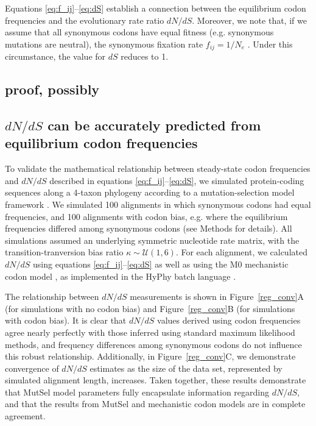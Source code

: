 \documentclass[11pt]{article}
\begin{document}
Equations \eqref{eq:f_ij}--\eqref{eq:dS} establish a connection between the equilibrium codon frequencies and the evolutionary rate ratio $dN/dS$. Moreover, we note that, if we assume that all synonymous codons have equal fitness (e.g. synonymous mutations are neutral), the synonymous fixation rate $f_{ij}= 1/N_e$ \cite{CrowKimura1970}. Under this circumstance, the value for $dS$ reduces to 1.

\subsection{proof, possibly}

\subsection*{$dN/dS$ can be accurately predicted from equilibrium codon frequencies}

To validate the mathematical relationship between steady-state codon frequencies and $dN/dS$ described in equations \eqref{eq:f_ij}--\eqref{eq:dS}, we simulated protein-coding sequences along a 4-taxon phylogeny according to a mutation-selection model framework \cite{HalpernBruno1998,SellaHirsh2005}. We simulated 100 alignments in which synonymous codons had equal frequencies, and 100 alignments with codon bias, e.g. where the equilibrium frequencies differed among synonymous codons (see Methods for details). All simulations assumed an underlying symmetric nucleotide rate matrix, with the transition-tranversion bias ratio $\kappa \sim \mathcal{U}(1,6)$. For each alignment, we calculated $dN/dS$ using equations \eqref{eq:f_ij}--\eqref{eq:dS} as well as using the M0 mechanistic codon model \cite{NielsenYang1998}, as implemented in the HyPhy batch language \cite{KosakovskyPondetal2005}.

The relationship between $dN/dS$ measurements is shown in Figure~\ref{reg_conv}A (for simulations with no codon bias) and Figure~\ref{reg_conv}B (for simulations with codon bias). It is clear that $dN/dS$ values derived using codon frequencies agree nearly perfectly with those inferred using standard maximum likelihood methods, and frequency differences among synonymous codons do not influence this robust relationship. Additionally, in Figure~\ref{reg_conv}C, we demonstrate convergence of $dN/dS$ estimates as the size of the data set, represented by simulated alignment length, increases. Taken together, these results demonstrate that MutSel model parameters fully encapsulate information regarding $dN/dS$, and that the results from MutSel and mechanistic codon models are in complete agreement.
\end{document}
